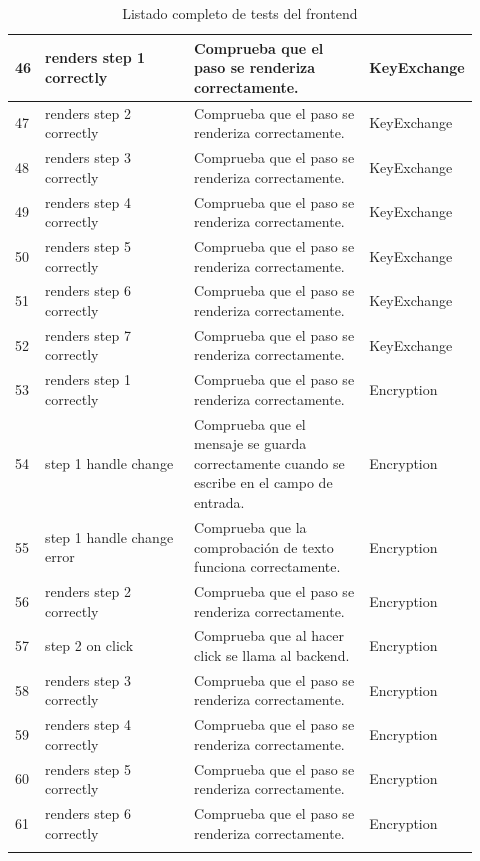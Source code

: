 \begin{longtable}{|p{0.02\linewidth}|p{0.35\linewidth}|p{0.4\linewidth}|p{0.15\linewidth}|}
    46 & renders step 1 correctly & Comprueba que el paso se renderiza correctamente. & KeyExchange \\ \hline
    47 & renders step 2 correctly & Comprueba que el paso se renderiza correctamente. & KeyExchange \\ \hline
    48 & renders step 3 correctly & Comprueba que el paso se renderiza correctamente. & KeyExchange \\ \hline
    49 & renders step 4 correctly & Comprueba que el paso se renderiza correctamente. & KeyExchange \\ \hline
    50 & renders step 5 correctly & Comprueba que el paso se renderiza correctamente. & KeyExchange \\ \hline
    51 & renders step 6 correctly & Comprueba que el paso se renderiza correctamente. & KeyExchange \\ \hline
    52 & renders step 7 correctly & Comprueba que el paso se renderiza correctamente. & KeyExchange \\ \hline

    53 & renders step 1 correctly & Comprueba que el paso se renderiza correctamente. & Encryption \\ \hline
    54 & step 1 handle change & Comprueba que el mensaje se guarda correctamente cuando se escribe en el campo de entrada. & Encryption \\ \hline
    55 & step 1 handle change error & Comprueba que la comprobación de texto funciona correctamente. & Encryption \\ \hline
    56 & renders step 2 correctly & Comprueba que el paso se renderiza correctamente. & Encryption \\ \hline
    57 & step 2 on click & Comprueba que al hacer click se llama al backend. & Encryption \\ \hline
    58 & renders step 3 correctly & Comprueba que el paso se renderiza correctamente. & Encryption \\ \hline
    59 & renders step 4 correctly & Comprueba que el paso se renderiza correctamente. & Encryption \\ \hline
    60 & renders step 5 correctly & Comprueba que el paso se renderiza correctamente. & Encryption \\ \hline
    61 & renders step 6 correctly & Comprueba que el paso se renderiza correctamente. & Encryption \\ \hline
    
    \caption{Listado completo de tests del frontend}
    \label{tab:tests-frontend}
\end{longtable}


